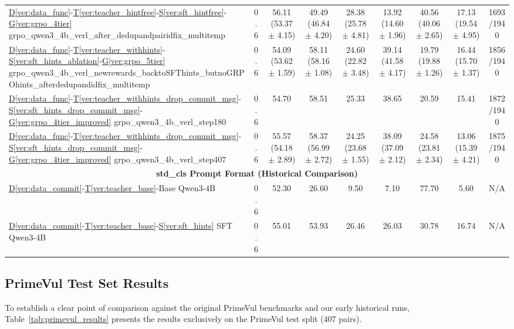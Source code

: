 \documentclass[12pt,a4paper]{article}
\newcommand{\vcode}[4]{\hyperref[#1]{D\ref*{#1}}-\hyperref[#2]{T\ref*{#2}}-\hyperref[#3]{S\ref*{#3}}-\hyperref[#4]{G\ref*{#4}}}
\newcommand{\vcodeSFT}[3]{\hyperref[#1]{D\ref*{#1}}-\hyperref[#2]{T\ref*{#2}}-\hyperref[#3]{S\ref*{#3}}}
\newcommand{\vcodeBase}[2]{\hyperref[#1]{D\ref*{#1}}-\hyperref[#2]{T\ref*{#2}}-Base}
\begin{document}
\begin{table}[H]
\begin{minipage}{\paperwidth}
{\begin{tabular}{lcccccccc}
\vcode{ver:data_func}{ver:teacher_hintfree}{ver:sft_hintfree}{ver:grpo_4tier} grpo_qwen3_4b_verl_after_dedupandpairidfix_multitemp & 0.6 & 56.11 (53.37 $\pm$ 4.15) & 49.49 (46.84 $\pm$ 4.20) & 28.38 (25.78 $\pm$ 4.81) & 13.92 (14.60 $\pm$ 1.96) & 40.56 (40.06 $\pm$ 2.65) & 17.13 (19.54 $\pm$ 4.95) & 1693/1940 \\
\vcode{ver:data_func}{ver:teacher_withhints}{ver:sft_hints_ablation}{ver:grpo_5tier} grpo_qwen3_4b_verl_newrewards_backtoSFThints_butnoGRPOhints_afterdedupandidfix_multitemp & 0.6 & 54.09 (53.62 $\pm$ 1.59) & 58.11 (58.16 $\pm$ 1.08) & 24.60 (22.82 $\pm$ 3.48) & 39.14 (41.58 $\pm$ 4.17) & 19.79 (19.88 $\pm$ 1.26) & 16.44 (15.70 $\pm$ 1.37) & 1856/1940 \\
\vcode{ver:data_func}{ver:teacher_withhints_drop_commit_msg}{ver:sft_hints_drop_commit_msg}{ver:grpo_4tier_improved} grpo_qwen3_4b_verl_step180 & 0.6 & 54.70 & 58.51 & 25.33 & 38.65 & 20.59 & 15.41 & 1872/1940 \\
\vcode{ver:data_func}{ver:teacher_withhints_drop_commit_msg}{ver:sft_hints_drop_commit_msg}{ver:grpo_4tier_improved} grpo_qwen3_4b_verl_step407 & 0.6 & 55.57 (54.18 $\pm$ 2.89) & 58.37 (56.99 $\pm$ 2.72) & 24.25 (23.68 $\pm$ 1.55) & 38.09 (37.09 $\pm$ 2.12) & 24.58 (23.81 $\pm$ 2.34) & 13.06 (15.39 $\pm$ 4.21) & 1875/1940 \\
\midrule
\multicolumn{9}{c}{\textbf{std\_cls Prompt Format (Historical Comparison)}} \\
\midrule
\vcodeBase{ver:data_commit}{ver:teacher_base} Qwen3-4B & 0.6 & 52.30 & 26.60 & 9.50 & 7.10 & 77.70 & 5.60 & N/A \\
\vcodeSFT{ver:data_commit}{ver:teacher_base}{ver:sft_hints} SFT Qwen3-4B & 0.6 & 55.01 & 53.93 & 26.46 & 26.03 & 30.78 & 16.74 & N/A \\
\bottomrule
\end{tabular}%
}
\end{minipage}
\end{table}

\subsection{PrimeVul Test Set Results}

To establish a clear point of comparison against the original PrimeVul benchmarks and our early historical runs, Table~\ref{tab:primevul_results} presents the results exclusively on the PrimeVul test split (407 pairs).
\end{document}
